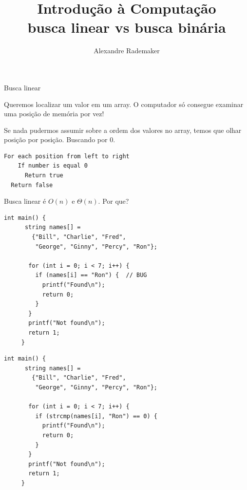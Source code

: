 \documentclass{beamer}
\title{Introdução à Computação \\ busca linear vs busca binária}
\author{Alexandre Rademaker}
\date{}
\begin{document}
\begin{frame}
 \maketitle
\end{frame}


\begin{frame}{Busca linear}

  Queremos localizar um valor em um array. O computador só consegue
  examinar uma posição de memória por vez!

  Se nada pudermos assumir sobre a ordem dos valores no array, temos
  que olhar posição por posição. Buscando por 0.

  \begin{lstlisting}[basicstyle=\ttfamily]
  For each position from left to right
    If number is equal 0
      Return true
  Return false  
  \end{lstlisting}

  Busca linear é $O(n)$ e $\Theta(n)$. Por que?

  \framebreak

  

  \framebreak

  \begin{lstlisting}[style=normalc,caption=src/names0.c]
    int main() {
      string names[] =
        {"Bill", "Charlie", "Fred",
         "George", "Ginny", "Percy", "Ron"};
  
       for (int i = 0; i < 7; i++) {
         if (names[i] == "Ron") {  // BUG
           printf("Found\n");
           return 0;
         }
       }
       printf("Not found\n");
       return 1;
     }
  \end{lstlisting}

  \framebreak

  \begin{lstlisting}[style=normalc,caption=src/names1.c]
    int main() {
      string names[] =
        {"Bill", "Charlie", "Fred",
         "George", "Ginny", "Percy", "Ron"};
      
       for (int i = 0; i < 7; i++) {
         if (strcmp(names[i], "Ron") == 0) {
           printf("Found\n");
           return 0;
         }
       }
       printf("Not found\n");
       return 1;
     }
  \end{lstlisting}

  \framebreak


\end{frame}
\end{document}
